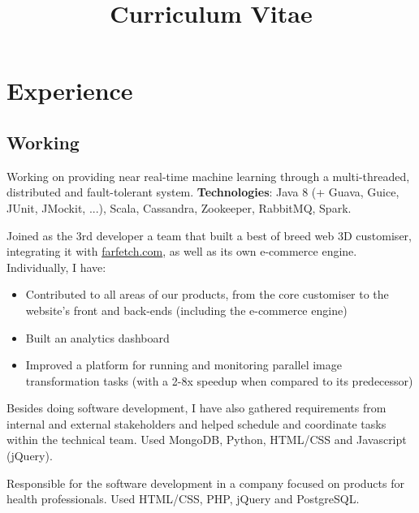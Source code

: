 \documentclass[11pt,a4paper]{moderncv}
\title{Curriculum Vitae}
\begin{document}
\maketitle

\vspace{-10mm}

\section{Experience}
\vspace{-2mm}
\subsection{Working}
{Working on providing near real-time machine learning through a multi-threaded, distributed and fault-tolerant system.
\newline \textbf{Technologies}: Java 8 (+ Guava, Guice, JUnit, JMockit, ...), Scala, Cassandra, Zookeeper, RabbitMQ, Spark.}
{Joined as the 3rd developer a team that built a best of breed web 3D customiser,
integrating it with \href{https://www.farfetch.com/}{farfetch.com}, as well as
its own e-commerce engine. Individually, I have:
\begin{itemize}
  \item Contributed to all areas of our products, from the core
  customiser to the website's front and back-ends (including the e-commerce engine)
  \item Built an analytics dashboard
  \item Improved a platform for running and monitoring parallel image transformation tasks
  (with a 2-8x speedup when compared to its predecessor)
\end{itemize}
Besides doing software development, I have also gathered requirements from internal and external
stakeholders and helped schedule and coordinate tasks within the technical team. Used MongoDB, Python, HTML/CSS and Javascript (jQuery).
}
{Responsible for the software development in a company focused on products for
health professionals. Used HTML/CSS, PHP, jQuery and PostgreSQL.}
\vspace{2mm}
\end{document}
